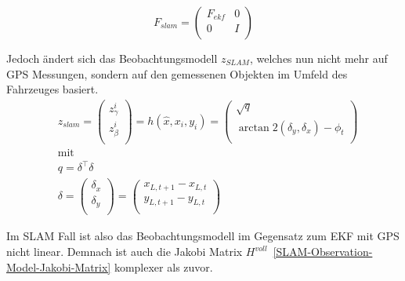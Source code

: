 \documentclass[11pt]{article}
\begin{document}
\begin{equation}\label{SLAM-Bewegungsmodell-Jakobi-Matrix}
	F_{slam} = \begin{pmatrix}
		F_{ekf} & 0 \\
		0 & I \\
	\end{pmatrix}
\end{equation}

Jedoch ändert sich das Beobachtungsmodell $z_{SLAM}$, welches nun nicht mehr auf GPS Messungen, sondern auf den gemessenen Objekten im Umfeld des Fahrzeuges basiert.
\begin{equation}\label{SLAM-Observation-Model}
\begin{split}
	&z_{slam} = \begin{pmatrix}
		z_\gamma^i \\
		z_\beta^i \\
	\end{pmatrix} = h(\hat{x}, x_i, y_i) = \begin{pmatrix}
		\sqrt{q} \\
		\arctan 2(\delta_y, \delta_x) - \phi_t \\
	\end{pmatrix}\\
	&\text{mit} \\
	&q = \delta^\intercal \delta \\
	&\delta = \begin{pmatrix}
		\delta_x \\
		\delta_y \\
	\end{pmatrix} = \begin{pmatrix}
		x_{L, t+1} - x_{L, t}  \\
		y_{L, t+1}  - y_{L, t} \\
	\end{pmatrix}
\end{split}
\end{equation}

Im SLAM Fall ist also das Beobachtungsmodell im Gegensatz zum EKF mit GPS nicht linear. Demnach ist auch die Jakobi Matrix $H^{voll}$~\ref{SLAM-Observation-Model-Jakobi-Matrix} komplexer als zuvor.
\end{document}
